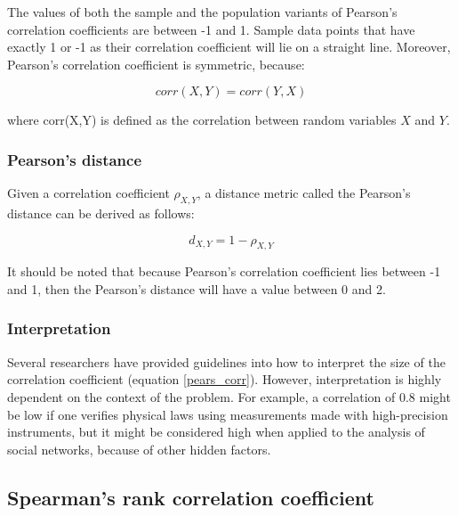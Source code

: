 The values of both the sample and the population variants of Pearson's
correlation coefficients are between -1 and 1. Sample data points that have 
exactly 1 or -1 as their correlation coefficient will lie on a straight line.
Moreover, Pearson's correlation coefficient is symmetric, because: 

$$ corr(X,Y) = corr(Y,X) $$

where corr(X,Y) is defined as the correlation between random variables $X$ and $Y$.

\subsubsection{Pearson's distance}

Given a correlation coefficient $ \rho_{X,Y} $, a distance metric
called the Pearson's distance can be derived as
follows\cite{fulekar2009bioinformatics}:

$$ d_{X,Y} = 1- \rho_{X,Y} $$

It should be noted that because Pearson's correlation coefficient lies between
-1 and 1, then the Pearson's distance will have a value between 0 and 2.

\subsubsection{Interpretation}

Several researchers have provided guidelines into how
to interpret the size of the correlation coefficient\cite{cohen1988statistical} 
(equation \ref{pears_corr}).
However, interpretation is highly dependent on the context of the problem. For
example, a correlation of 0.8 might be low if one verifies physical laws using
measurements made with high-precision instruments, but it might be considered
high when applied to the analysis of social networks, because of other hidden
factors.

\subsection{Spearman's rank correlation coefficient}


